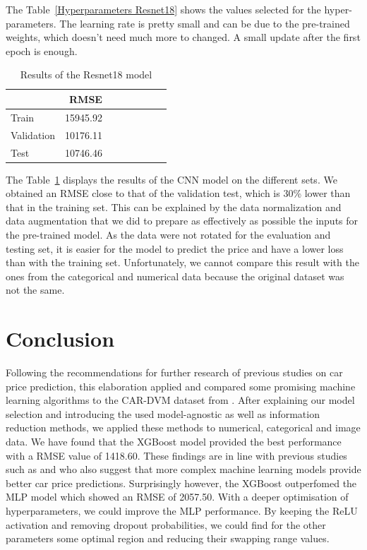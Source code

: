 \documentclass[12pt]{article}
\begin{document}
\noindent The Table~\ref{Hyperparameters Resnet18} shows the values selected for the hyper-parameters. The learning rate is pretty small and can be due to the pre-trained weights, which doesn't need much more to changed. A small update after the first epoch is enough.

\FloatBarrier
\begin{table}[h]
    \centering
    \caption{Results of the Resnet18 model}
    \label{Results CNN}
    \begin{tabular}{lrrrrrrr}
    \toprule
           & RMSE \\
    \midrule
    Train & 15945.92\\
    Validation & 10176.11\\
    Test & 10746.46\\
    \bottomrule
    \end{tabular}
\end{table}
\FloatBarrier




\noindent The Table~\ref{Results CNN} displays the results of the CNN model on the different sets. We obtained an RMSE close to that of the validation test, which is 30\% lower than that in the training set. This can be explained by the data normalization and data augmentation that we did to prepare as effectively as possible the inputs for the pre-trained model. As the data were not rotated for the evaluation and testing set, it is easier for the model to predict the price and have a lower loss than with the training set. Unfortunately, we cannot compare this result with the ones from the categorical and numerical data because the original dataset was not the same. 


\section{Conclusion}
Following the recommendations for further research of previous studies on car price prediction, this elaboration applied and compared some promising machine learning algorithms to the CAR-DVM dataset from \cite{chen2017comparative}. After explaining our model selection and introducing the used model-agnostic as well as information reduction methods, we applied these methods to numerical, categorical and image data. We have found that the XGBoost model provided the best performance with a RMSE value of 1418.60. These findings are in line with previous studies such as \cite{Pudaruth2014} and \cite{Gajera2021} who also suggest that more complex machine learning models provide better car price predictions. Surprisingly however, the XGBoost outperfomed the MLP model which showed an RMSE of 2057.50. With a deeper optimisation of hyperparameters, we could improve the MLP performance. By keeping the ReLU activation and removing dropout probabilities, we could find for the other parameters some optimal region and reducing their swapping range values.\\
\end{document}
